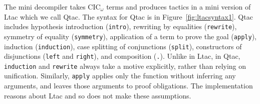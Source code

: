 The mini decompiler takes CIC$_{\omega}$ terms and produces tactics in a mini version of Ltac which we call Qtac.
The syntax for Qtac is in Figure~\ref{fig:ltacsyntax1}.
Qtac includes hypothesis introduction (\lstinline{intro}),
rewriting by equalities (\lstinline{rewrite}), symmetry of equality (\lstinline{symmetry}),
application of a term to prove the goal (\lstinline{apply}), induction (\lstinline{induction}),
case splitting of conjunctions (\lstinline{split}),
constructors of disjunctions (\lstinline{left} and \lstinline{right}), and
composition (\lstinline{.}).
Unlike in Ltac, in Qtac, \lstinline{induction} and \lstinline{rewrite} always take a motive explicitly, rather than relying on unification.
Similarly, \lstinline{apply} applies only the function without inferring any arguments, and leaves those arguments to proof obligations.
The implementation reasons about Ltac and so does not make these assumptions.

